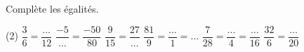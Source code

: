 %
%
Complète les égalités.
  \begin{tasks}(2)
    \task $\dfrac{3}{6} = \dfrac{\ldots}{12}$
    \task $\dfrac{- 5}{\ldots} = \dfrac{- 50}{80}$
    \task $\dfrac{9}{15} = \dfrac{27}{\ldots}$
    \task $\dfrac{81}{9} = \dfrac{\ldots}{1} = \ldots$
    \task $\dfrac{7}{28} = \dfrac{\ldots}{4} = \dfrac{\ldots}{16}$
    \task $\dfrac{32}{6} = \dfrac{\ldots}{20}$
  \end{tasks}
